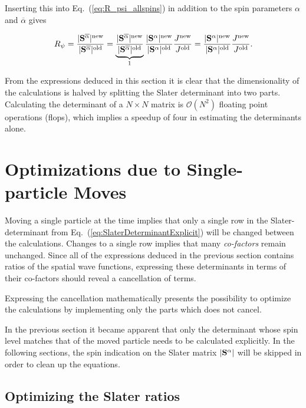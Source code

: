 Inserting this into Eq.~(\ref{eq:R_psi_allspins}) in addition to the spin parameters $\alpha$ and $\overline{\alpha}$ gives

\begin{equation}
 R_\psi = \frac{|\mathbf{S}^{\overline{\alpha}}|^\mathrm{new}}{|\mathbf{S}^{\overline{\alpha}}|^\mathrm{old}} = \underbrace{\frac{|\mathbf{S}^{\overline{\alpha}}|^\mathrm{new}}{|\mathbf{S}^{\overline{\alpha}}|^\mathrm{old}}}_{1}\frac{|\mathbf{S}^{\alpha}|^\mathrm{new}}{|\mathbf{S}^{\alpha}|^\mathrm{old}}\frac{J^\mathrm{new}}{J^\mathrm{old}} = \frac{|\mathbf{S}^{\alpha}|^\mathrm{new}}{|\mathbf{S}^{\alpha}|^\mathrm{old}}\frac{J^\mathrm{new}}{J^\mathrm{old}}. \label{eq:RpsiOpt}
\end{equation}

From the expressions deduced in this section it is clear that the dimensionality of the calculations is halved by splitting the Slater determinant into two parts. Calculating the determinant of a $N\times N$ matrix is $\mathcal{O}(N^2)$ floating point operations (flops), which implies a speedup of four in estimating the determinants alone. 

\section{Optimizations due to Single-particle Moves}

Moving a single particle at the time implies that only a single row in the Slater-determinant from Eq.~(\ref{eq:SlaterDeterminantExplicit}) will be changed between the calculations. Changes to a single row implies that many \textit{co-factors} remain unchanged. Since all of the expressions deduced in the previous section contains ratios of the spatial wave functions, expressing these determinants in terms of their co-factors should reveal a cancellation of terms. 

Expressing the cancellation mathematically presents the possibility to optimize the calculations by implementing only the parts which does not cancel. 

In the previous section it became apparent that only the determinant whose spin level matches that of the moved particle needs to be calculated explicitly. In the following sections, the spin indication on the Slater matrix $|\mathbf{S}^{\alpha}|$ will be skipped in order to clean up the equations.

\subsection{Optimizing the Slater ratios}
\label{sec:optSlaterRat}

\newcommand{\Sinv}{\mathbf{S}^{-1}}

